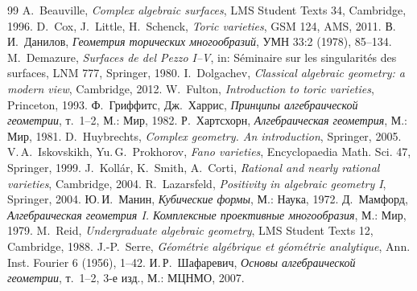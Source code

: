 \documentclass[11pt,a4paper]{article}
\theoremstyle{plain}
\theoremstyle{definition}
\theoremstyle{remark}
\begin{document}
\begin{thebibliography}{99}
 A.~Beauville, \emph{Complex algebraic surfaces}, LMS Student Texts 34, Cambridge, 1996.
 D.~Cox, J.~Little, H.~Schenck, \emph{Toric varieties}, GSM 124, AMS, 2011.
 В.\,И.~Данилов, \emph{Геометрия торических многообразий}, УМН 33:2 (1978), 85--134.
 M.~Demazure, \emph{Surfaces de del Pezzo I--V}, in: S\'eminaire sur les singularit\'es des surfaces, LNM 777, Springer, 1980.
 I.~Dolgachev, \emph{Classical algebraic geometry: a modern view}, Cambridge, 2012.
 W.~Fulton, \emph{Introduction to toric varieties}, Princeton, 1993.
 Ф.~Гриффитс, Дж.~Харрис, \emph{Принципы алгебраической геометрии}, т.~1--2, М.: Мир, 1982.
 Р.~Хартсхорн, \emph{Алгебраическая геометрия}, М.: Мир, 1981.
 D.~Huybrechts, \emph{Complex geometry. An introduction}, Springer, 2005.
 V.\,A.~Iskovskikh, Yu.\,G.~Prokhorov, \emph{Fano varieties}, Encyclopaedia Math. Sci. 47, Springer, 1999.
 J.~Koll\'ar, K.~Smith, A.~Corti, \emph{Rational and nearly rational varieties}, Cambridge, 2004.
 R.~Lazarsfeld, \emph{Positivity in algebraic geometry I}, Springer, 2004.
 Ю.\,И.~Манин, \emph{Кубические формы}, М.: Наука, 1972.
 Д.~Мамфорд, \emph{Алгебраическая геометрия I. Комплексные проективные многообразия}, М.: Мир, 1979.
 M.~Reid, \emph{Undergraduate algebraic geometry}, LMS Student Texts 12, Cambridge, 1988.
 J.-P.~Serre, \emph{G\'eom\'etrie alg\'ebrique et g\'eom\'etrie analytique}, Ann. Inst. Fourier 6 (1956), 1--42.
 И.\,Р.~Шафаревич, \emph{Основы алгебраической геометрии}, т.~1--2, 3-е изд., М.: МЦНМО, 2007.
\end{thebibliography}
\end{document}
